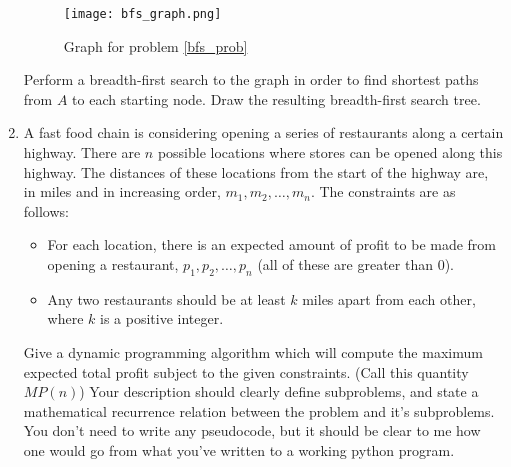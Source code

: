 \documentclass[12pt]{article}
\begin{document}
\begin{enumerate}
\begin{center}
    \begin{figure}[h]
        \caption{Graph for problem \ref{bfs_prob}}
        \texttt{[image: bfs\_graph.png]}
    \end{figure}
    \end{center}
    \newline Perform a breadth-first search to the graph in order to find shortest paths from $A$ to each starting node. Draw the resulting breadth-first search tree. 
    \newpage
    \item A fast food chain is considering opening a series of restaurants along a certain highway. There are $n$ possible locations where stores can be opened along this highway. The distances of these locations from the start of the highway are, in miles and in increasing order, $m_1, m_2, \ldots, m_n$. The constraints are as follows:
    \begin{itemize}
        \item For each location, there is an expected amount of profit to be made from opening a restaurant, $p_1, p_2, \ldots, p_n$ (all of these are greater than $0$).
        \item Any two restaurants should be at least $k$ miles apart from each other, where $k$ is a positive integer. 
    \end{itemize} 
    Give a dynamic programming algorithm which will compute the maximum expected total profit subject to the given constraints. (Call this quantity $MP(n)$) Your description should clearly define subproblems, and state a mathematical recurrence relation between the problem and it's subproblems. You don't need to write any pseudocode, but it should be clear to me how one would go from what you've written to a working python program. 
\end{enumerate}
\end{document}
